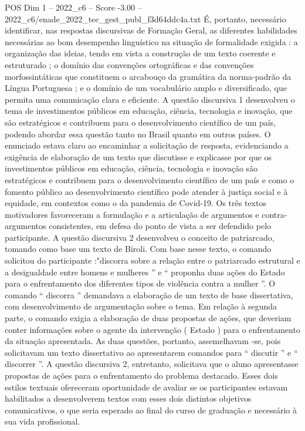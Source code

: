 \begin{textsample}{POS Dim 1 – 2022\_c6 – Score -3.00 – 2022\_c6/enade\_2022\_tec\_gest\_publ\_f3d64ddc4a.txt}
É, portanto, necessário identificar, nas respostas discursivas de Formação Geral, as diferentes habilidades necessárias ao bom desempenho linguístico na situação de formalidade exigida : a organização das ideias, tendo em vista a construção de um texto coerente e estruturado ; o domínio das convenções ortográficas e das convenções morfossintáticas que constituem o arcabouço da gramática da norma-padrão da Língua Portuguesa ; e o domínio de um vocabulário amplo e diversificado, que permita uma comunicação clara e eficiente.
A questão discursiva 1 desenvolveu o tema de investimentos públicos em educação, ciência, tecnologia e inovação, que são estratégicos e contribuem para o desenvolvimento científico de um país, podendo abordar essa questão tanto no Brasil quanto em outros países.
O enunciado estava claro ao encaminhar a solicitação de resposta, evidenciando a exigência de elaboração de um texto que discutisse e explicasse por que os investimentos públicos em educação, ciência, tecnologia e inovação são estratégicos e contribuem para o desenvolvimento científico de um país e como o fomento público ao desenvolvimento científico pode atender à justiça social e à equidade, em contextos como o da pandemia de Covid-19.
Os três textos motivadores favoreceram a formulação e a articulação de argumentos e contra-argumentos consistentes, em defesa do ponto de vista a ser defendido pelo participante.
A questão discursiva 2 desenvolveu o conceito de patriarcado, tomando como base um texto de Biroli.
Com base nesse texto, o comando solicitou do participante :"discorra sobre a relação entre o patriarcado estrutural e a desigualdade entre homens e mulheres ” e “ proponha duas ações do Estado para o enfrentamento dos diferentes tipos de violência contra a mulher ”.
O comando “ discorra ” demandava a elaboração de um texto de base dissertativa, com desenvolvimento de argumentação sobre o tema.
Em relação à segunda parte, o comando exigia a elaboração de duas propostas de ações, que deveriam conter informações sobre o agente da intervenção ( Estado ) para o enfrentamento da situação apresentada.
As duas questões, portanto, assemelhavam -se, pois solicitavam um texto dissertativo ao apresentarem comandos para “ discutir ” e “ discorrer ”.
A questão discursiva 2, entretanto, solicitava que o aluno apresentasse propostas de ações para o enfrentamento do problema destacado.
Esses dois estilos textuais ofereceram oportunidade de avaliar se os participantes estavam habilitados a desenvolverem textos com esses dois distintos objetivos comunicativos, o que seria esperado ao final do curso de graduação e necessário à sua vida profissional.

\end{textsample}
